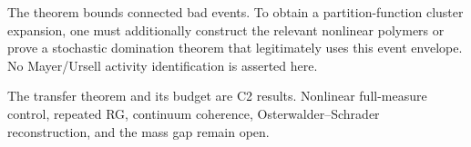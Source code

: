 \documentclass[11pt]{article}
\begin{document}
The theorem bounds connected bad events.  To obtain a partition-function
cluster expansion, one must additionally construct the relevant nonlinear
polymers or prove a stochastic domination theorem that legitimately uses this
event envelope.  No Mayer/Ursell activity identification is asserted here.

The transfer theorem and its budget are C2 results.  Nonlinear full-measure
control, repeated RG, continuum coherence, Osterwalder--Schrader
reconstruction, and the mass gap remain open.
\end{document}
